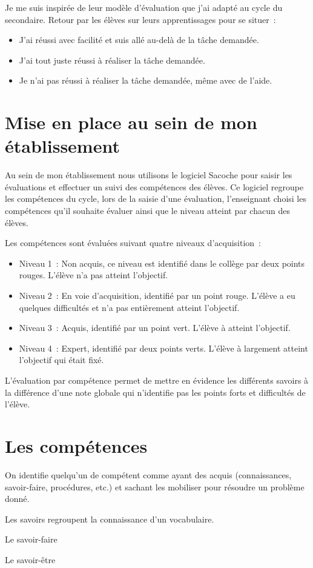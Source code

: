 Je me suis inspirée de leur modèle d'évaluation que j'ai adapté au cycle du secondaire.
Retour par les élèves sur leurs apprentissages pour se situer~:
\begin{itemize}
\item J'ai réussi avec facilité et suis allé au-delà de la tâche demandée. 
\item J'ai tout juste réussi à réaliser la tâche demandée.
\item Je n'ai pas réussi à réaliser la tâche demandée, même avec de l'aide.
\end{itemize} 



\section{Mise en place au sein de mon établissement}

Au sein de mon établissement nous utilisons le logiciel Sacoche pour saisir les évaluations et effectuer un suivi des compétences des élèves.
Ce logiciel regroupe les compétences du cycle, lors de la saisie d'une évaluation, l'enseignant choisi les compétences qu'il souhaite évaluer ainsi que le niveau atteint par chacun des élèves.

Les compétences sont évaluées suivant quatre niveaux d'acquisition~:
\begin{itemize}
\item Niveau 1~: Non acquis, ce niveau est identifié dans le collège par deux points rouges. L'élève n'a pas atteint l'objectif.
\item Niveau 2~: En voie d'acquisition, identifié par un point rouge. L'élève a eu quelques difficultés et n'a pas entièrement atteint l'objectif.
\item Niveau 3~: Acquis, identifié par un point vert. L'élève à atteint l'objectif.
\item Niveau 4~: Expert, identifié par deux points verts. L'élève à largement atteint l'objectif qui était fixé.
\end{itemize}

L'évaluation par compétence permet de mettre en évidence les différents savoirs à la différence d'une note globale qui n'identifie pas les points forts et difficultés de l'élève.


\section{Les compétences}

On identifie quelqu'un de compétent comme ayant des acquis (connaissances, savoir-faire, procédures, etc.) et sachant les mobiliser pour résoudre un problème donné.

Les savoirs regroupent la connaissance d'un vocabulaire.

Le savoir-faire

Le savoir-être

